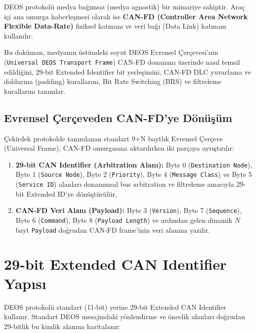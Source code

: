 \documentclass[a4paper,10pt]{article}
\newcommand{\code}[1]{\texttt{#1}}
\begin{document}
DEOS protokolü medya bağımsız (medya agnostik) bir mimariye sahiptir. Araç içi ana omurga haberleşmesi olarak ise \textbf{CAN-FD (Controller Area Network Flexible Data-Rate)} fiziksel katmanı ve veri bağı (Data Link) katmanı kullanılır.

Bu doküman, medyanın üstündeki soyut DEOS Evrensel Çerçevesi'nin (\code{Universal DEOS Transport Frame}) CAN-FD donanımı üzerinde nasıl temsil edildiğini, 29-bit Extended Identifier bit yerleşimini, CAN-FD DLC yuvarlama ve doldurma (padding) kurallarını, Bit Rate Switching (BRS) ve filtreleme kurallarını tanımlar.

\subsection{Evrensel Çerçeveden CAN-FD'ye Dönüşüm}

Çekirdek protokolde tanımlanan standart 9+N baytlık Evrensel Çerçeve (Universal Frame), CAN-FD omurgasına aktarılırken iki parçaya ayrıştırılır:
\begin{enumerate}
    \item \textbf{29-bit CAN Identifier (Arbitration Alanı):} Byte 0 (\code{Destination Node}), Byte 1 (\code{Source Node}), Byte 2 (\code{Priority}), Byte 4 (\code{Message Class}) ve Byte 5 (\code{Service ID}) alanları donanımsal bus arbitration ve filtreleme amacıyla 29-bit Extended ID'ye dönüştürülür.
    \item \textbf{CAN-FD Veri Alanı (Payload):} Byte 3 (\code{Version}), Byte 7 (\code{Sequence}), Byte 6 (\code{Command}), Byte 8 (\code{Payload Length}) ve ardından gelen dinamik $N$ bayt \code{Payload} doğrudan CAN-FD frame'inin veri alanına yazılır.
\end{enumerate}

\section{29-bit Extended CAN Identifier Yapısı}

DEOS protokolü standart (11-bit) yerine 29-bit Extended CAN Identifier kullanır. Standart DEOS mesajındaki yönlendirme ve öncelik alanları doğrudan 29-bitlik bu kimlik alanına haritalanır:
\end{document}
